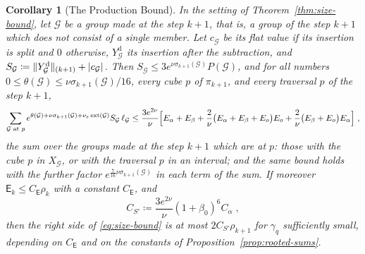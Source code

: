 \documentclass[11pt]{preprint}
\DeclarePairedDelimiter{\abs}{\lvert}{\rvert}
\DeclarePairedDelimiter{\norm}{\lVert}{\rVert}
\numberwithin{equation}{section}
\newtheorem{corollary}[theorem]{Corollary}
\theoremstyle{definition}
\theoremstyle{remark}
\theoremstyle{plain}
\begin{document}
\begin{corollary}[The Production Bound]\label{cor:production-bound}
In the setting of Theorem~\ref{thm:size-bound}, let $\mathcal G$ be a group made at the step $k + 1$, that is, a group of the step $k + 1$ which does not consist of a single member. Let $c_{\mathcal G}$ be its flat value if its insertion is split and $0$ otherwise, $Y^{\mathrm d}_{\mathcal G}$ its insertion after the subtraction, and $S_{\mathcal G} \coloneqq \norm{Y^{\mathrm d}_{\mathcal G}}_{(k+1)} + \abs{c_{\mathcal G}}$. Then $S_{\mathcal G} \leq 3e^{\nu\sigma_{k+1}(\mathcal G)}P(\mathcal G)$, and for all numbers $0 \leq \theta(\mathcal G) \leq \nu\sigma_{k+1}(\mathcal G)/16$, every cube $p$ of $\pi_{k+1}$, and every traversal $p$ of the step $k + 1$,
\begin{equation}\label{eq:size-bound}
    \sum_{\mathcal G \text{ at } p}e^{\theta(\mathcal G) + \nu\sigma_{k+1}(\mathcal G) + \nu_e\operatorname{ext}(\mathcal G)}S_{\mathcal G}\,\ell_{\mathcal G} \leq \frac{3e^{2\nu}}{\nu}\Bigl[E_\alpha + E_\beta + \frac{2}{\nu}\bigl(E_\alpha + E_\beta + E_o\bigr)E_o + \frac{2}{\nu}\bigl(E_\beta + E_o\bigr)E_\alpha\Bigr]\;,
\end{equation}
the sum over the groups made at the step $k + 1$ which are at $p$: those with the cube $p$ in $X_{\mathcal G}$, or with the traversal $p$ in an interval; and the same bound holds with the further factor $e^{\frac{7}{16}\nu\sigma_{k+1}(\mathcal G)}$ in each term of the sum. If moreover $\mathsf E_k \leq C_{\mathsf E}\rho_k$ with a constant $C_{\mathsf E}$, and
\begin{equation}\label{eq:size-constant}
    C_{S'} \coloneqq \frac{3e^{2\nu}}{\nu}(1 + \beta_0)^6C_\alpha\;,
\end{equation}
then the right side of \eqref{eq:size-bound} is at most $2C_{S'}\rho_{k+1}$ for $\gamma_q$ sufficiently small, depending on $C_{\mathsf E}$ and on the constants of Proposition~\ref{prop:rooted-sums}.
\end{corollary}
\end{document}
